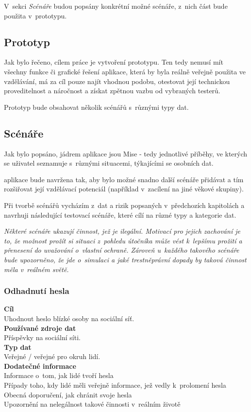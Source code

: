 V~sekci \textit{Scénáře} budou popsány konkrétní možné scénáře, z~nich část bude použita v~prototypu.

\subsection{Prototyp}
Jak bylo řečeno, cílem práce je vytvoření prototypu. Ten tedy nemusí mít všechny funkce či grafické řešení aplikace, která by byla reálně veřejně použita ve vzdělávání, má za cíl pouze najít vhodnou podobu, otestovat její technickou proveditelnost a náročnost a získat zpětnou vazbu od vybraných testerů.

Prototyp bude obsahovat několik scénářů s~různými typy dat.


\subsection{Scénáře}
Jak bylo popsáno, jádrem aplikace jsou Mise - tedy jednotlivé příběhy, ve kterých se uživatel seznamuje s~různými situacemi, týkajícími se osobních dat.

aplikace bude navržena tak, aby bylo možné snadno další scénáře přidávat a tím rozšiřovat její vzdělávací potenciál (například v~zacílení na jiné věkové skupiny).

Při tvorbě scénářů vycházím z~dat a rizik popsaných v~předchozích kapitolách a navrhuji následující testovací scénáře, které cílí na různé typy a kategorie dat.

\textit{Některé scénáře ukazují činnost, jež je ilegální. Motivací pro jejich zachování je to, že  možnost prožít si situaci z~pohledu útočníka může vést k~lepšímu prožití a přenesení do uvažování o~vlastní ochraně. Zároveň u~každého takového scénáře bude upozorněno, že jde o~simulaci a jaké trestněprávní dopady by taková činnost měla v~reálném světě.}

\subsubsection*{Odhadnutí hesla}
\textbf{Cíl}\\
Uhodnout heslo blízké osoby na sociální síť.\\
\textbf{Používané zdroje dat}\\
Příspěvky na sociální síti.\\
\textbf{Typ dat}\\
Veřejné / veřejné pro okruh lidí.\\
\textbf{Dodatečné informace}\\
Informace o~tom, jak lidé tvoří hesla\\
Případy toho, kdy lidé měli veřejně informace, jež vedly k~prolomení hesla\\
Obecná doporučení, jak chránit svoje hesla\\
Upozornění na nelegálnost takové činnosti v~reálním životě\\

